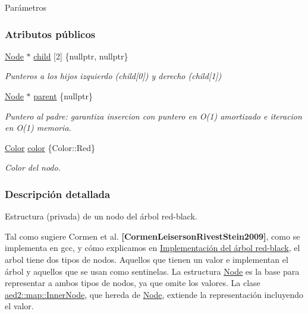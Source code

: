 \begin{DoxyParams}{\-Parámetros}
\subsubsection*{Atributos públicos}
\begin{DoxyCompactItemize}
\item 
\hyperlink{structaed2_1_1iterator_1_1Node}{Node} $\ast$ \hyperlink{structaed2_1_1iterator_1_1Node_aaf0597e2d3402329e0c30db030777f04_aaf0597e2d3402329e0c30db030777f04}{child} \mbox{[}2\mbox{]} \{nullptr, nullptr\}
\begin{DoxyCompactList}\small\item\em Punteros a los hijos izquierdo (child\mbox{[}0\mbox{]}) y derecho (child\mbox{[}1\mbox{]}) \end{DoxyCompactList}\item 
\hyperlink{structaed2_1_1iterator_1_1Node}{Node} $\ast$ \hyperlink{structaed2_1_1iterator_1_1Node_a7f097f76a613a17fc9d03c8f153cb5e4_a7f097f76a613a17fc9d03c8f153cb5e4}{parent} \{nullptr\}
\begin{DoxyCompactList}\small\item\em Puntero al padre\+: garantiza insercion con puntero en O(1) amortizado e iteracion en O(1) memoria. \end{DoxyCompactList}\item 
\hyperlink{classaed2_1_1iterator_aaa188f82ba585d8de525b1400242cf4f_aaa188f82ba585d8de525b1400242cf4f}{Color} \hyperlink{structaed2_1_1iterator_1_1Node_a07d4b83de27938ece64e1a6db4a055cc_a07d4b83de27938ece64e1a6db4a055cc}{color} \{Color\+::\+Red\}
\begin{DoxyCompactList}\small\item\em Color del nodo. \end{DoxyCompactList}\end{DoxyCompactItemize}


\subsubsection{Descripción detallada}
Estructura (privada) de un nodo del árbol red-\/black. 

Tal como sugiere Cormen et al. {\bfseries [Cormen\+Leiserson\+Rivest\+Stein2009]}, como se implementa en gcc, y cómo explicamos en \hyperlink{Implementacion}{Implementación del árbol red-\/black}, el arbol tiene dos tipos de nodos. Aquellos que tienen un valor e implementan el árbol y aquellos que se usan como sentinelas. La estructura \hyperlink{structaed2_1_1iterator_1_1Node}{Node} es la base para representar a ambos tipos de nodos, ya que omite los valores. La clase \hyperlink{structaed2_1_1map_1_1InnerNode}{aed2\+::map\+::\+Inner\+Node}, que hereda de \hyperlink{structaed2_1_1iterator_1_1Node}{Node}, extiende la representación incluyendo el valor.


\end{DoxyParams}
